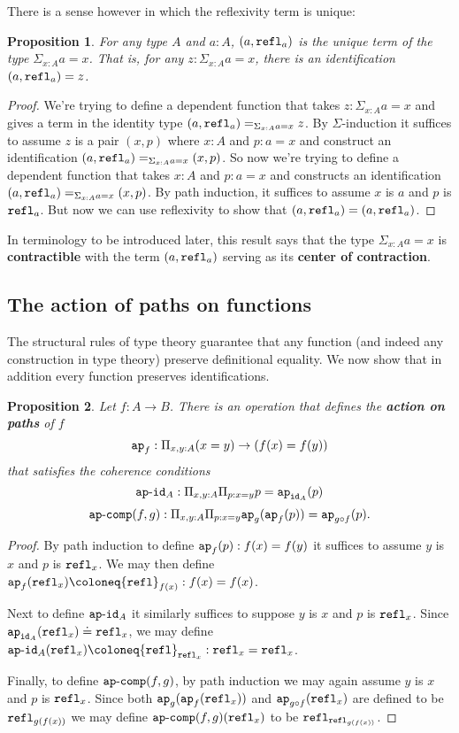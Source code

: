 \documentclass{amsart}
\theoremstyle{theorem}
\newtheorem*{prop}{Proposition}
\theoremstyle{definition}
\theoremstyle{remark}
\newcommand{\0}{\mathbbe{0}}
\newcommand{\1}{\mathbbe{1}}
\newcommand{\2}{\mathbbe{2}}
\newcommand{\3}{\mathbbe{3}}
\newcommand{\4}{\mathbbe{4}}
\newcommand{\term}[1]{{\textup{\texttt{#1}}}}
\newcommand{\id}{\term{id}}
\newcommand{\refl}{\term{refl}}
\newcommand{\ap}{\term{ap}}
\newcommand{\apcoh}[1]{\term{ap}\text{-}\term{#1}}
\begin{document}
There is a sense however in which the reflexivity term is unique:

\begin{prop} For any type $A$ and $a : A$, $(a, \refl_a)$ is the unique term of the type $\Sigma_{x : A} a =x$. That is, for any $z : \Sigma_{x :A} a =x$, there is an identification $(a, \refl_a) = z$.
\end{prop}
\begin{proof} We're trying to define a dependent function that takes $z : \Sigma_{x :A} a =x$ and gives a term in the identity type $(a,\refl_a) =_{\Sigma_{x :A} a =x} z$. By $\Sigma$-induction it suffices to assume $z$ is a pair $(x,p)$ where $x :A$ and $p : a =x$ and construct an identification $(a, \refl_a) =_{\Sigma_{x :A} a =x} (x,p)$. So now we're trying to define a dependent function that takes $x :A$ and $p : a =x$ and constructs an identification $(a, \refl_a) =_{\Sigma_{x :A} a =x} (x,p)$. By path induction, it suffices to assume $x$ is $a$ and $p$ is $\refl_a$. But now we can use reflexivity to show that $(a, \refl_a) = (a, \refl_a)$.
\end{proof}

In terminology to be introduced later, this result says that the type $\Sigma_{x : A} a =x$ is \textbf{contractible} with the term  $(a, \refl_a)$ serving as its \textbf{center of contraction}.


\subsection*{The action of paths on functions}

The structural rules of type theory guarantee that any function (and indeed any construction in type theory) preserve definitional equality. We now show that in addition every function preserves identifications.

\begin{prop} Let $f \colon A \to B$. There is an operation that defines the \textbf{action on paths} of $f$
\[ \ap_f : \Pi_{x,y :A} (x=y) \to (f(x) = f(y))\]
that satisfies the coherence conditions
\[ \apcoh{id}_A : \Pi_{x,y:A} \Pi_{p : x= y} p = \ap_{\id_A}(p)\]
\[ \apcoh{comp}(f,g) : \Pi_{x,y:A} \Pi_{p: x=y} \ap_g(\ap_f(p))= \ap_{g\circ f}(p).\]
\end{prop}
\begin{proof}
By path induction to define $\ap_f(p) : f(x)=f(y)$ it suffices to assume $y$ is $x$ and $p$ is $\refl_x$. We may then define $\ap_f(\refl_x) \coloneq \refl_{f(x)} : f(x) = f(x)$.

Next to define $\apcoh{id}_A$ it similarly suffices to suppose $y$ is $x$ and $p$ is $\refl_x$. Since $\ap_{\id_A}(\refl_x)\doteq \refl_x$, we may define $\apcoh{id}_A(\refl_x) \coloneq \refl_{\refl_x} : \refl_x = \refl_x$.

Finally, to define $\apcoh{comp}(f,g)$, by path induction we may again assume $y$ is $x$ and $p$ is $\refl_x$. Since both $\ap_g(\ap_f(\refl_x))$ and $\ap_{g \circ f}(\refl_x)$ are defined to be $\refl_{g(f(x))}$ we may define $\apcoh{comp}(f,g)(\refl_x)$ to be $\refl_{\refl_{g(f(x))}}$.
\end{proof}
\end{document}
